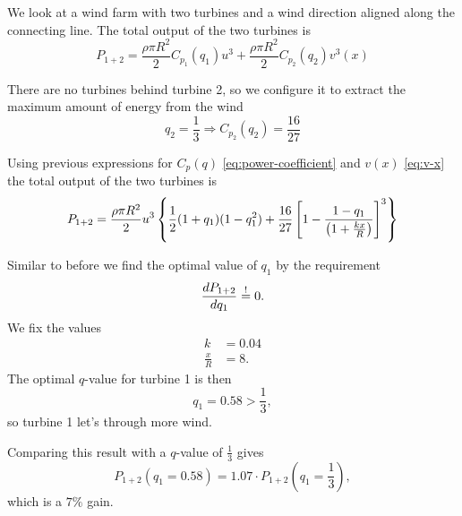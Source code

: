 We look at a wind farm with two turbines and a wind direction aligned along the connecting line. The total output of the two turbines is
\begin{equation}
P_{1+2} = \frac{\rho\pi R^2}{2}C_{p_1}(q_1)u^3 + \frac{\rho\pi R^2}{2}C_{p_2}(q_2)v^3(x)
\end{equation}

There are no turbines behind turbine 2, so we configure it to extract the maximum amount of energy from the wind
\begin{equation}
q_2=\frac{1}{3} \Rightarrow C_{p_2}(q_2) = \frac{16}{27}
\end{equation}

Using previous expressions for $C_p(q)$ \eqref{eq:power-coefficient} and $v(x)$ \eqref{eq:v-x} the total output of the two turbines is
\begin{equation}
P_{1+2} = \frac{\rho\pi R^2}{2}u^3 \left\{\frac{1}{2}(1+q_1)(1-q_1^2) + \frac{16}{27}\left[1-\frac{1-q_1}{\left(1+\frac{kx}{R}\right)} \right]^3 \right\}
\end{equation}

Similar to before we find the optimal value of $q_1$ by the requirement
\begin{equation}
\frac{d P_{1+2}}{d q_1} \overset{!}{=} 0.
\end{equation}
We fix the values
\begin{align*}
k &= 0.04\\
\frac{x}{R} &= 8.
\end{align*}
The optimal $q$-value for turbine 1 is then
\begin{equation}
q_1 = 0.58 > \frac{1}{3},
\end{equation}
so turbine 1 let's through more wind.

Comparing this result with a $q$-value of $\frac{1}{3}$ gives
\begin{equation}
P_{1+2}(q_1=0.58) = 1.07 \cdot P_{1+2}\left(q_1=\frac{1}{3}\right),
\end{equation}
which is a $7\%$ gain.